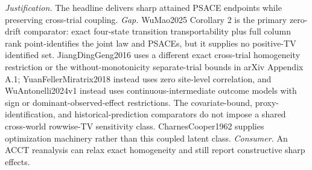 \documentclass{article}
\begin{document}
\par\smallskip\noindent \textit{Justification.} The headline delivers sharp attained PSACE endpoints while preserving cross-trial coupling. \textit{Gap.} WuMao2025 Corollary 2 is the primary zero-drift comparator: exact four-state transition transportability plus full column rank point-identifies the joint law and PSACEs, but it supplies no positive-TV identified set. JiangDingGeng2016 uses a different exact cross-trial homogeneity restriction or the without-monotonicity separate-trial bounds in arXiv Appendix A.1; YuanFellerMiratrix2018 instead uses zero site-level correlation, and WuAntonelli2024v1 instead uses continuous-intermediate outcome models with sign or dominant-observed-effect restrictions. The covariate-bound, proxy-identification, and historical-prediction comparators do not impose a shared cross-world rowwise-TV sensitivity class. CharnesCooper1962 supplies optimization machinery rather than this coupled latent class. \textit{Consumer.} An ACCT reanalysis can relax exact homogeneity and still report constructive sharp effects.
\end{document}
